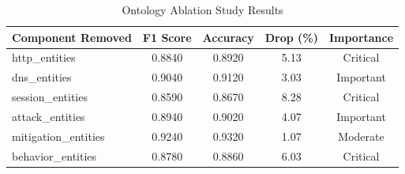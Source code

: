 \begin{table}[htbp]
\centering
\caption{Ontology Ablation Study Results}
\label{tab:ablation_ontology}
\begin{tabular}{lcccc}
\toprule
Component Removed & F1 Score & Accuracy & Drop (\%) & Importance \\
\midrule
http_entities & 0.8840 & 0.8920 & 5.13 & Critical \\
dns_entities & 0.9040 & 0.9120 & 3.03 & Important \\
session_entities & 0.8590 & 0.8670 & 8.28 & Critical \\
attack_entities & 0.8940 & 0.9020 & 4.07 & Important \\
mitigation_entities & 0.9240 & 0.9320 & 1.07 & Moderate \\
behavior_entities & 0.8780 & 0.8860 & 6.03 & Critical \\
\bottomrule
\end{tabular}
\end{table}